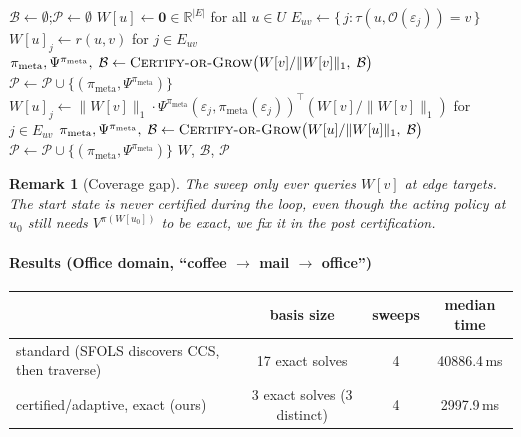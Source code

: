 \documentclass[11pt]{article}
\newtheorem{remark}{Remark}
\begin{document}
\begin{algorithm}[H]
\caption{\textsc{Certified-RM-VI}}
\begin{algorithmic}[1]
\State $\mathcal{B}\gets\emptyset$;\quad $\mathcal P\gets\emptyset$ 
\State $W[u]\gets\mathbf{0}\in\mathbb{R}^{|E|}$ for all $u\in U$
\Repeat
    \State $E_{uv}\gets\{\,j:\tau(u,\mathcal{O}(\varepsilon_j))=v\,\}$
      \State $W[u]_j\gets r(u,v)$ for $j\in E_{uv}$
    \Else
      \State $\pi_{\mathrm{meta}},\Psi^{\pi_{\mathrm{meta}}},\;\mathcal{B}\gets\textsc{Certify-or-Grow}\big(W[v]/\|W[v]\|_1,\;\mathcal{B}\big)$
      \State $\mathcal P\gets\mathcal P\cup\{(\pi_{\mathrm{meta}},\Psi^{\pi_{\mathrm{meta}}})\}$ 
      \State $W[u]_j\gets\|W[v]\|_1\cdot\Psi^{\pi_{\mathrm{meta}}}(\varepsilon_j,\pi_{\mathrm{meta}}(\varepsilon_j))^\top(W[v]/\|W[v]\|_1)$ for $j\in E_{uv}$
    \EndIf
  \EndFor
{}
  \State $\pi_{\mathrm{meta}},\Psi^{\pi_{\mathrm{meta}}},\;\mathcal{B}\gets\textsc{Certify-or-Grow}\big(W[u]/\|W[u]\|_1,\;\mathcal{B}\big)$
  \State $\mathcal P\gets\mathcal P\cup\{(\pi_{\mathrm{meta}},\Psi^{\pi_{\mathrm{meta}}})\}$
\EndFor
\State \Return $W$, $\mathcal{B}$, $\mathcal P$
\end{algorithmic}
\end{algorithm}

\begin{remark}[Coverage gap]
The sweep only ever queries $W[v]$ at edge \emph{targets}. The start state is never certified during the loop, even though the acting policy at $u_0$ still needs $V^{\pi(W[u_0])}$ to be exact, we fix it in the post certification.
\end{remark}

\paragraph{Results (Office domain, ``coffee $\to$ mail $\to$ office'')}

\begin{center}
\begin{tabular}{lccc}
\toprule
 & basis size & sweeps & median time \\
\midrule
standard (SFOLS discovers CCS, then traverse) & 17 exact solves & 4 & 40886.4\,ms \\
certified/adaptive, exact (ours) & 3 exact solves (3 distinct) & 4 & 2997.9\,ms \\
\bottomrule
\end{tabular}
\end{center}
\end{document}
